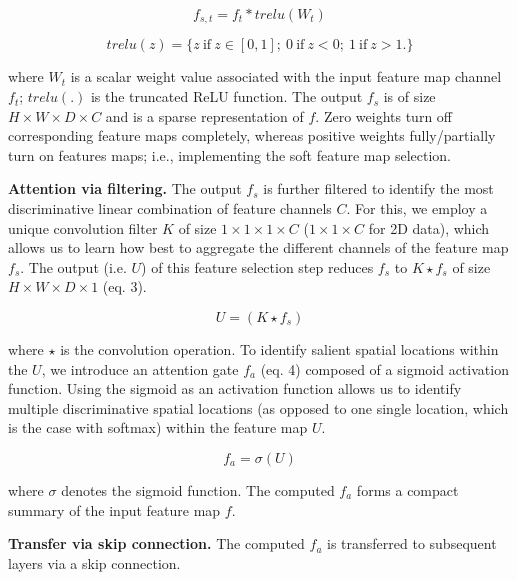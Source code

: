 \documentclass{article}
\begin{document}
\begin{equation}
f_{s,t} = f_{t}\ast trelu (W_t)
\end{equation}

\begin{equation}
trelu(z) = \{z \ \textrm{if} \ z\in [0,1]; \ 0 \ \textrm{if} \ z<0; \ 1 \ \textrm{if} \ z>1. \}
\end{equation}

\noindent where $W_t$ is a scalar weight value associated with the input feature map channel $f_t$; $trelu(.)$ is the truncated ReLU function. The output $f_s$ is of size $H\times W\times D\times C$ and is a sparse representation of $f$. Zero weights turn off corresponding feature maps completely, whereas positive weights fully/partially turn on features maps; i.e., implementing the soft feature map selection.

\noindent \textbf{Attention via filtering.} The output $f_s$ is further filtered to identify the most discriminative linear combination of feature channels $C$. For this, we employ a unique convolution filter $K$ of size $1\times 1\times 1\times C$ ($1\times 1\times C$ for 2D data), which allows us to learn how best to aggregate the different channels of the feature map $f_s$. The output (i.e. $U$) of this feature selection step reduces $f_s$ to $K\star f_s$ of size $H\times W\times D\times 1$ (eq. 3).

\begin{equation}
U=(K\star f_s)
\end{equation}


\noindent where $\star$ is the convolution operation. To identify salient spatial locations within the $U$, we introduce an attention gate $f_a$ (eq. 4) composed of a sigmoid activation function. Using the sigmoid as an activation function allows us to identify multiple discriminative spatial locations (as opposed to one single location, which is the case with softmax) within the feature map $U$.

\begin{equation}
f_a= \sigma(U)
\end{equation}

\noindent where $\sigma$ denotes the sigmoid function. The computed $f_a$ forms a compact summary of the input feature map $f$.

\noindent \textbf{Transfer via skip connection.} The computed $f_a$ is transferred to subsequent layers via a skip connection.
\end{document}
